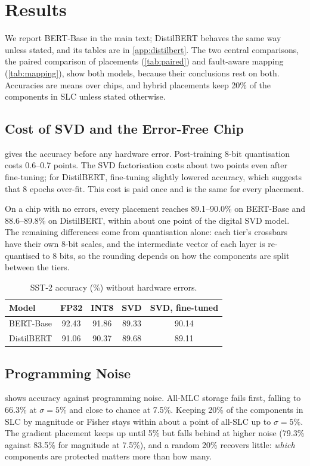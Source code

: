 \section{Results}\label{sec:results}

We report BERT-Base in the main text; DistilBERT behaves the same way unless stated, and its tables are
in \cref{app:distilbert}. The two central comparisons, the paired comparison of placements
(\cref{tab:paired}) and fault-aware mapping (\cref{tab:mapping}), show both models, because their
conclusions rest on both. Accuracies are means over chips, and hybrid placements keep 20\% of the
components in SLC unless stated otherwise.

\subsection{Cost of SVD and the Error-Free Chip}
 gives the accuracy before any hardware error. Post-training 8-bit quantisation costs
0.6--0.7 points. The SVD factorisation costs about two points even after fine-tuning; for DistilBERT,
fine-tuning slightly lowered accuracy, which suggests that 8 epochs over-fit. This cost is paid once and
is the same for every placement.

On a chip with no errors, every placement reaches 89.1--90.0\% on BERT-Base and 88.6--89.8\% on
DistilBERT, within about one point of the digital SVD model. The remaining differences come from
quantisation alone: each tier's crossbars have their own 8-bit scales, and the intermediate vector of
each layer is re-quantised to 8 bits, so the rounding depends on how the components are split between the
tiers.

\begin{table}[t]
\centering\footnotesize
\caption{SST-2 accuracy (\%) without hardware errors.}\label{tab:svd}
\setlength{\tabcolsep}{4pt}
\begin{tabular}{@{}lcccc@{}}
\toprule
Model & FP32 & INT8 & SVD & SVD, fine-tuned \\
\midrule
BERT-Base  & 92.43 & 91.86 & 89.33 & 90.14 \\
DistilBERT & 91.06 & 90.37 & 89.68 & 89.11 \\
\bottomrule
\end{tabular}
\end{table}

\subsection{Programming Noise}
 shows accuracy against programming noise. All-MLC storage fails first, falling to 66.3\% at
$\sigma=5\%$ and close to chance at 7.5\%. Keeping 20\% of the components in SLC by magnitude or Fisher stays
within about a point of all-SLC up to $\sigma=5\%$. The gradient placement keeps up until 5\% but falls behind
at higher noise (79.3\% against 83.5\% for magnitude at 7.5\%), and a random 20\% recovers little:
\emph{which} components are protected matters more than how many.

